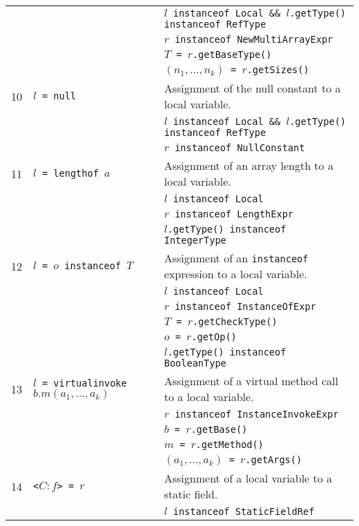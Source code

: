 \documentclass{article}
\begin{document}
\begin{scriptsize}
\begin{tabular}{lll}
&                & \texttt{$l$ instanceof Local \&\& $l$.getType() instanceof RefType}\\
&                & \texttt{$r$ instanceof NewMultiArrayExpr}\\
&                & \texttt{$T$ = $r$.getBaseType()}\\
&                & \texttt{$(n_1,\ldots,n_k)$ = $r$.getSizes()}\\
\hline
10 & \texttt{$l$ = null}                & Assignment of the null constant to a local variable.\\
&                & \texttt{$l$ instanceof Local \&\& $l$.getType() instanceof RefType}\\
&                & \texttt{$r$ instanceof NullConstant}\\
\hline
11 & \texttt{$l$ = lengthof $a$}    & Assignment of an array length to a local variable.\\
&                & \texttt{$l$ instanceof Local}\\
&                & \texttt{$r$ instanceof LengthExpr}\\
&                & \texttt{$l$.getType() instanceof IntegerType}\\
\hline
12 & \texttt{$l$ = $o$ instanceof $T$}    & Assignment of an \texttt{instanceof} expression to a local variable.\\
&                & \texttt{$l$ instanceof Local}\\
&                & \texttt{$r$ instanceof InstanceOfExpr}\\
&                & \texttt{$T$ = $r$.getCheckType()}\\
&                & \texttt{$o$ = $r$.getOp()}\\
&                & \texttt{$l$.getType() instanceof BooleanType}\\
\hline
13 & \texttt{$l$ = virtualinvoke $b.m(a_1,\ldots,a_k)$}              & Assignment of a virtual method call to a local variable.\\
&                & \texttt{$r$ instanceof InstanceInvokeExpr}\\
&                & \texttt{$b$ = $r$.getBase()}\\
&                & \texttt{$m$ = $r$.getMethod()}\\
&                & \texttt{$(a_1,\ldots,a_k)$ = $r$.getArgs()}\\
\hline
14 & \texttt{<$C:f$> = $r$}       & Assignment of a local variable to a static field.\\
&                & \texttt{$l$ instanceof StaticFieldRef}\\

\end{tabular}
\end{scriptsize}
\end{document}
